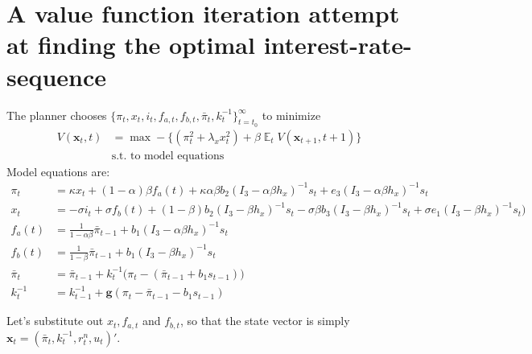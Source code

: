 \documentclass[11pt]{article}
\renewcommand{\[}{\begin{equation}}
\renewcommand{\]}{\end{equation}}
\DeclareMathOperator{\E}{\mathbb{E}}
\begin{document}

\newpage
\section{A value function iteration attempt at finding the optimal interest-rate-sequence}
The planner chooses $\{\pi_t, x_t, i_t, f_{a,t},  f_{b,t}, \bar{\pi}_t, k_t^{-1}\}_{t=t_0}^{\infty}$ to minimize
\begin{align}
V(\mathbf{x}_t,t)& = \max -\bigg\{ (\pi_t^2 + \lambda_x x_t^2) + \beta \E_t V(\mathbf{x}_{t+1},t+1) \bigg\} \\
& \text{s.t. to model equations}
\end{align}
Model equations are:
 \begin{align}
 \pi_t & = \kappa x_t +(1-\alpha)\beta f_a(t) +\kappa\alpha\beta b_2 (I_3 - \alpha\beta h_x)^{-1}s_t +e_3(I_3 - \alpha\beta h_x)^{-1}s_t  \label{midsimple_first}\\
 x_t & = -\sigma i_t +\sigma f_b(t)  +  (1-\beta)b_2 (I_3 - \beta h_x)^{-1}s_t - \sigma\beta b_3 (I_3 - \beta h_x)^{-1}s_t +\sigma e_1(I_3 - \beta h_x)^{-1}s_t  \big) \\
 f_a(t) &= \frac{1}{1-\alpha\beta}\bar{\pi}_{t-1}  + b_1(I_3 - \alpha\beta h_x)^{-1}s_t  \\
 f_b(t) & = \frac{1}{1-\beta}\bar{\pi}_{t-1}  + b_1(I_3 - \beta h_x)^{-1}s_t  \\
 \bar{\pi}_{t} & = \bar{\pi}_{t-1} + k_t^{-1}\big(\pi_{t} -(\bar{\pi}_{t-1}+b_1 s_{t-1}) \big)     \\
 k_t^{-1} & = k_{t-1}^{-1}+ \mathbf{g}(\pi_t - \bar{\pi}_{t-1}-b_1 s_{t-1})  
 \label{midsimple_last}
\end{align}

\newpage
Let's substitute out $x_t, f_{a,t}$ and $f_{b,t}$, so that the state vector is simply $\mathbf{x}_t = (\bar{\pi}_t, k_t^{-1},r_t^n,u_t)'$.
\end{document}
